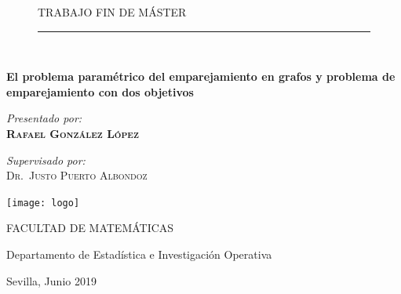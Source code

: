\documentclass[twoside,a4paper,openright,12pt,tikz]{book}
\begin{document}
\begin{titlepage}

\vspace*{1in}
\begin{center}
\vspace*{-1in}
\begin{figure}[htb]
\begin{center}
\begin{large}
TRABAJO FIN DE MÁSTER\\
\end{large}
\rule{80mm}{0.1mm}\\
\vspace*{0.1in}
\end{center}
\end{figure}
\begin{large}
\end{large}

\vspace*{0.2in}
\begin{Large}
{\huge \bfseries El problema paramétrico del emparejamiento en grafos y
problema de emparejamiento con dos objetivos}\\[2cm]
\end{Large}

\begin{center} \Large
\emph{Presentado por:}\\
\textsc{ \bf{Rafael González López}}
\end{center}

\vspace*{0.2in}
\begin{center} \large
\emph{Supervisado por:} \\
\textsc{Dr.~Justo Puerto Albondoz}\\
\end{center}
\vspace*{0.2in}

\centering
\texttt{[image: logo]}



\begin{large}
\centering
FACULTAD DE MATEMÁTICAS \\
\end{large} 

\begin{large}
Departamento de Estadística e Investigación Operativa\\
\end{large}


\begin{large}
\centering
Sevilla, Junio 2019\\
 \end{large}
\end{center}


\end{titlepage}
\end{document}
